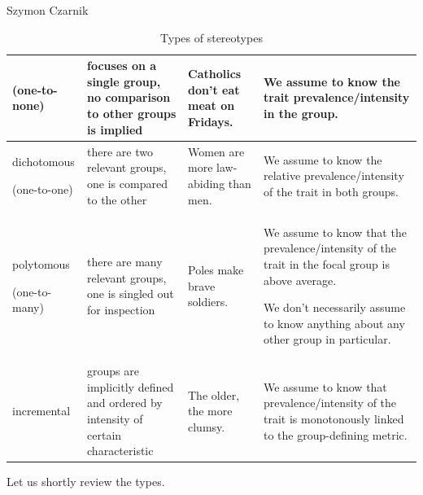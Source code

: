 \begin{artengenv}{Szymon Czarnik}
\begin{table}[H]
\begin{flushleft}
\begin{small}
\begin{tabular}{|m{}|m{}|m{}|m{}|}
(one-to-none) &
focuses on a single group, no comparison to other groups is implied &
Catholics don't eat meat on Fridays. &
We assume to know the trait prevalence/intensity in the group.\\\hline
dichotomous

(one-to-one) &
there are two relevant groups, one is compared to the other &
Women are more law-abiding than men. &
We assume to know the relative prevalence/intensity of the trait in both groups. \\\hline
polytomous

(one-to-many) &
there are many relevant groups, one is singled out for inspection &
Poles make brave soldiers. &
We assume to know that the prevalence/intensity of the trait in the focal group is above average.

We don't necessarily assume to know anything about any other group in particular. \\\hline
incremental &
groups are implicitly defined and ordered by intensity of certain characteristic &
The older, the more clumsy. &
We assume to know that prevalence/intensity of the trait is monotonously linked to the group-defining metric.\\\hline

\end{tabular}
\caption{Types of stereotypes}\label{table1-czar}
\end{small}
\end{flushleft}
\end{table}

Let us shortly review the types.


\end{artengenv}
